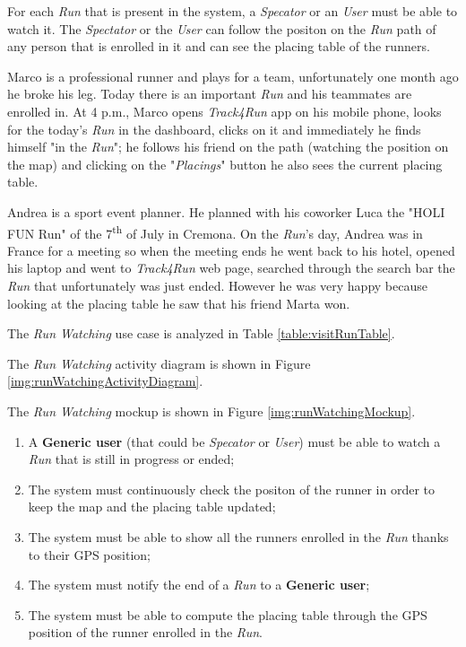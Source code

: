 For each \textit{Run} that is present in the system, a \textit{Specator} or an \textit{User} must be able to watch it.
The \textit{Spectator} or the \textit{User} can follow the positon on the \textit{Run} path of any person that is enrolled in it and can see the placing table of the runners.

Marco is a professional runner and plays for a team, unfortunately one month ago he broke his leg. Today there is an important \textit{Run} and his teammates are enrolled in. At 4 p.m., Marco opens \textit{Track4Run} app on his mobile phone, looks for the today's \textit{Run} in the dashboard, clicks on it and immediately he finds himself "in the \textit{Run}";
he follows his friend on the path (watching the position on the map) and clicking on the "\textit{Placings}" button he also sees the current placing table.

Andrea is a sport event planner. He planned with his coworker Luca the "HOLI FUN Run" of the 7\textsuperscript{th} of July in Cremona. On the \textit{Run}'s day, Andrea was in France for a meeting so when the meeting ends he went back to his hotel, opened his laptop and went to \textit{Track4Run} web page, searched through the search bar the \textit{Run} that unfortunately was just ended. However he was very happy because looking at the placing table he saw that his friend Marta won.

The \textit{Run Watching} use case is analyzed in Table \ref{table:visitRunTable}.

The \textit{Run Watching} activity diagram is shown in Figure \ref{img:runWatchingActivityDiagram}.

The \textit{Run Watching} mockup is shown in Figure \ref{img:runWatchingMockup}.

\begin{enumerate}
  \item A \textbf{Generic user} (that could be \textit{Specator} or \textit{User}) must be able to watch a \textit{Run} that is still in progress or ended;
  \item The system must continuously check the positon of the runner in order to keep the map and the placing table updated;
  \item The system must be able to show all the runners enrolled in the \textit{Run} thanks to their GPS position;
  \item The system must notify the end of a \textit{Run} to a \textbf{Generic user};
  \item The system must be able to compute the placing table through the GPS position of the runner enrolled in the \textit{Run}.
\end{enumerate}

